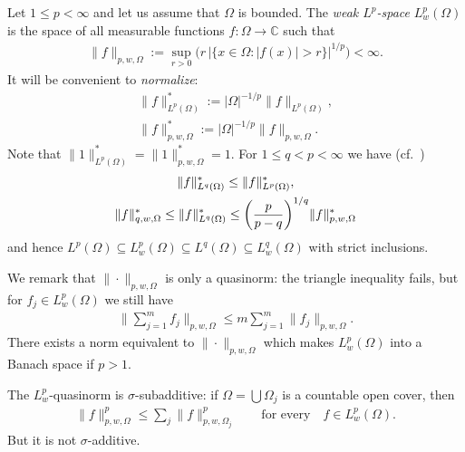 \documentclass[pdftex]{sigma}
\numberwithin{equation}{section}
\def\si{\sigma}
\def\Om{\Omega}
\def\C{\mathbb{C}}
\begin{document}
Let $1 \le p < \infty$ and let us assume that $\Om$ is bounded.
The \emph{weak $L^p$-space} $L_w^p(\Om)$ is the space of all measurable functions $f \colon \Om \to \C$ such that
\begin{gather*}
\|f\|_{p,w,\Om} := \sup_{r> 0} \big( r\, |\{x \in \Om \colon |f(x)| > r\}|^{1/p} \big) < \infty.
\end{gather*}
It will be convenient to \emph{normalize}:
\begin{gather*}
 \|f\|^*_{L^p(\Om)} := |\Om|^{-1/p} \|f\|_{L^p(\Om)},\\
 \|f\|^*_{p,w,\Om} := |\Om|^{-1/p} \|f\|_{p,w,\Om}.
\end{gather*}
Note that $\|1\|^*_{L^p(\Om)} = \|1\|^*_{p,w,\Om} =1$.
For $1 \le q < p < \infty$ we have (cf.\ \cite[Exercise\ 1.1.11]{Grafakos08})
\begin{gather}
 \|f\|^*_{L^q(\Om)} \le \|f\|^*_{L^p(\Om)}, \notag \\
 \|f\|^*_{q,w,\Om} \le \|f\|^*_{L^q(\Om)} \le \bigg(\frac{p}{p-q}\bigg)^{1/q}
 \|f\|^*_{p,w,\Om} \label{eq:qp}
\end{gather}
and hence
$L^p(\Om) \subseteq L_w^p(\Om) \subseteq L^q(\Om) \subseteq L_w^q(\Om)$
with strict inclusions.





We remark that $\|\cdot\|_{p,w,\Om}$ is only a quasinorm: the triangle inequality fails, but for
$f_j \in L_w^p(\Om)$
we still have
\begin{gather*}
\bigg\|\sum_{j=1}^m f_j \bigg\|_{p,w,\Om} \le m \sum_{j=1}^m \|f_j\|_{p,w,\Om}.
\end{gather*}
There exists a norm equivalent to $\|\cdot\|_{p,w,\Om}$ which makes $L_w^p(\Om)$ into a Banach space if $p>1$.

The $L^p_w$-quasinorm is $\si$-subadditive: if
$\Om = \bigcup \Om_j$ is a countable open cover, then
\begin{gather*}
 \|f\|^p_{p,w,\Om} \le \sum_j \|f\|^p_{p,w,\Om_j} \qquad \text{for every}\quad f \in L^p_w(\Om).
\end{gather*}
But it is not $\si$-additive.
\end{document}
